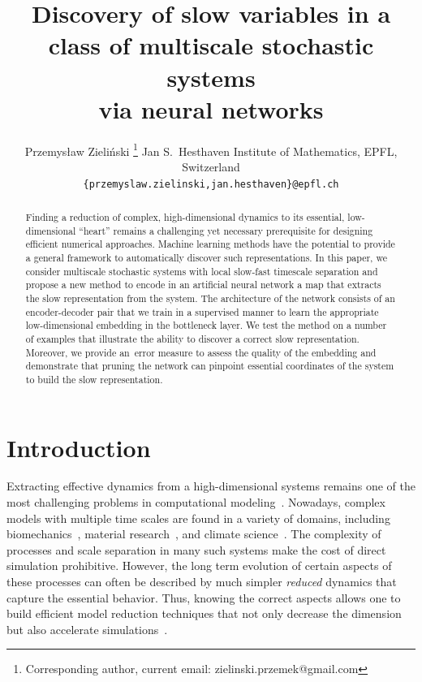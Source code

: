 \documentclass{article}
\title{Discovery of slow variables in a class of multiscale stochastic systems\\ via neural networks}
\author{
    \href{https://orcid.org/0000-0003-3317-8908}{\orcid}
    Przemys{\l}aw Zieli\'{n}ski
    \thanks{Corresponding author, current email: zielinski.przemek@gmail.com}
	\And
	\href{https://orcid.org/0000-0001-8074-1586}{\orcid}
	Jan S.~Hesthaven
	\And
	\textnormal{Institute of Mathematics, EPFL, Switzerland}\\[.5em]
	\texttt{\{przemyslaw.zielinski,jan.hesthaven\}@epfl.ch}
}
\begin{document}
\maketitle

\begin{abstract}
    Finding a reduction of complex, high-dimensional dynamics to its essential, low-dimensional ``heart'' remains a challenging yet necessary prerequisite for designing efficient numerical approaches. Machine learning methods have the potential to provide a general framework to automatically discover such representations. In this paper, we consider multiscale stochastic systems with local slow-fast timescale separation and propose a new method to encode in an artificial neural network a map that extracts the slow representation from the system. The architecture of the network consists of an encoder-decoder pair that we train in a supervised manner to learn the appropriate low-dimensional embedding in the bottleneck layer. We test the method on a number of examples that illustrate the ability to discover a correct slow representation. Moreover, we provide an~error measure to assess the quality of the embedding and demonstrate that pruning the network can pinpoint essential coordinates of the system to build the slow representation.
\end{abstract}




\section{Introduction}
\label{sec:intro}
Extracting effective dynamics from a high-dimensional systems remains one of the most challenging problems in computational modeling~\cite{froyland_computational_2014}. Nowadays, complex models with multiple time scales are found in a variety of domains, including biomechanics~\cite{bhattacharya_multiscale_2017, favino_multiscale_2018}, material research~\cite{praprotnik_multiscale_2008, van_der_giessen_roadmap_2020}, and climate science~\cite{majda_mathematical_2001, palmer_stochastic_2019}. The complexity of processes and scale separation in many such systems make the cost of direct simulation prohibitive. However, the long term evolution of certain aspects of these processes can often be described by much simpler \emph{reduced} dynamics that capture the essential behavior. Thus, knowing the correct aspects allows one to build efficient model reduction techniques that not only decrease the dimension but also accelerate simulations~\cite{debrabant_micro-macro_2017,katsoulakis_datadriven_2020,kevrekidis_equation-free_2009,legoll_effective_2010}.
\end{document}
